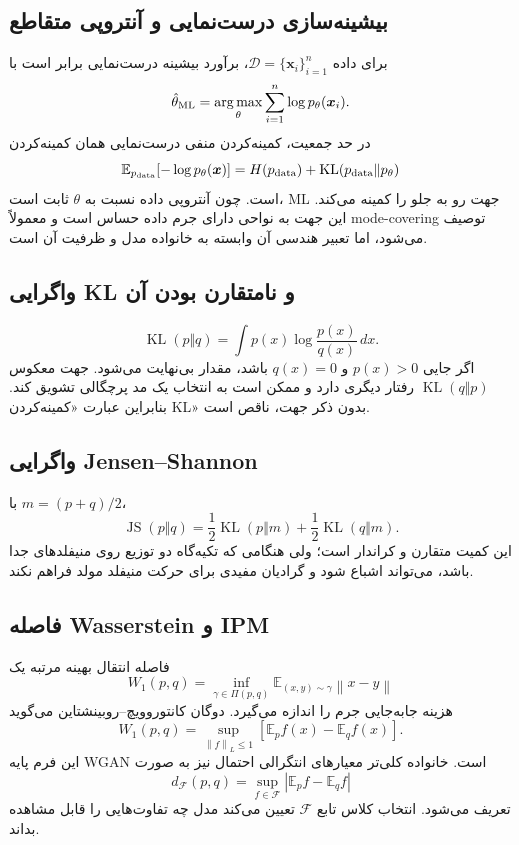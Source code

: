 \documentclass[12pt,openany,oneside]{book}
\newcommand{\E}{\mathbb{E}}
\newcommand{\norm}[1]{\left\lVert #1\right\rVert}
\newcommand{\vect}[1]{\bm{#1}}
\newcommand{\argmax}{\operatorname*{arg\,max}}
\newcommand{\KL}{\operatorname{KL}}
\newcommand{\JS}{\operatorname{JS}}
\begin{document}
\subsection{بیشینه‌سازی درست‌نمایی و آنتروپی متقاطع}
برای داده $\mathcal D=\{\vect x_i\}_{i=1}^n$، برآورد بیشینه درست‌نمایی برابر است با
\begin{equation}
 \hat\theta_{\rm ML}=\argmax_\theta \sum_{i=1}^n \log p_\theta(\vect x_i).
\end{equation}
در حد جمعیت، کمینه‌کردن منفی درست‌نمایی همان کمینه‌کردن
\begin{equation}
 \E_{p_{\rm data}}[-\log p_\theta(\vect x)]
 =H(p_{\rm data})+\KL(p_{\rm data}\Vert p_\theta)
\end{equation}
است. چون آنتروپی داده نسبت به $\theta$ ثابت است، ML جهت  رو به جلو را کمینه می‌کند. این جهت به نواحی دارای
جرم داده حساس است و معمولاً mode-covering توصیف می‌شود، اما تعبیر هندسی آن وابسته به خانواده مدل و ظرفیت آن است.

\subsection{واگرایی KL و نامتقارن بودن آن}
\begin{equation}
 \KL(p\Vert q)=\int p(x)\log\frac{p(x)}{q(x)}\,dx.
\end{equation}
اگر جایی $p(x)>0$ و $q(x)=0$ باشد، مقدار بی‌نهایت می‌شود. جهت معکوس $\KL(q\Vert p)$ رفتار دیگری دارد و ممکن است
به انتخاب یک مد پرچگالی تشویق کند. بنابراین عبارت «کمینه‌کردن KL» بدون ذکر جهت، ناقص است.

\subsection{واگرایی Jensen--Shannon}
با $m=(p+q)/2$،
\begin{equation}
 \JS(p\Vert q)=\frac12\KL(p\Vert m)+\frac12\KL(q\Vert m).
\end{equation}
این کمیت متقارن و کراندار است؛ ولی هنگامی که تکیه‌گاه دو توزیع روی منیفلدهای جدا باشد، می‌تواند اشباع شود و گرادیان
مفیدی برای حرکت منیفلد مولد فراهم نکند.

\subsection{فاصله Wasserstein و IPM}
فاصله انتقال بهینه مرتبه یک
\begin{equation}
 W_1(p,q)=\inf_{\gamma\in\Pi(p,q)}\E_{(x,y)\sim\gamma}\norm{x-y}
\end{equation}
هزینه جابه‌جایی جرم را اندازه می‌گیرد. دوگان کانتوروویچ--روبینشتاین می‌گوید
\begin{equation}
 W_1(p,q)=\sup_{\norm{f}_{L}\le 1}\left[\E_p f(x)-\E_q f(x)\right].
\end{equation}
این فرم پایه WGAN است. خانواده کلی‌تر معیارهای انتگرالی احتمال نیز به صورت
\begin{equation}
 d_{\mathcal F}(p,q)=\sup_{f\in\mathcal F}\left|\E_p f-\E_q f\right|
\end{equation}
تعریف می‌شود. انتخاب کلاس تابع $\mathcal F$ تعیین می‌کند مدل چه تفاوت‌هایی را قابل مشاهده بداند.
\end{document}
